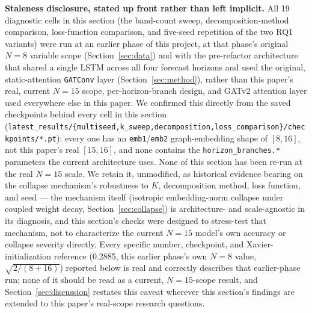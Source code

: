 \documentclass[journal]{IEEEtran}
\begin{document}
\textbf{Staleness disclosure, stated up front rather than left implicit.} All 19 diagnostic cells in this section (the band-count sweep, decomposition-method comparison, loss-function comparison, and five-seed repetition of the two RQ1 variants) were run at an earlier phase of this project, at that phase's original $N=8$ variable scope (Section~\ref{sec:data}) and with the pre-refactor architecture that shared a single LSTM across all four forecast horizons and used the original, static-attention \texttt{GATConv} layer (Section~\ref{sec:method}), rather than this paper's real, current $N=15$ scope, per-horizon-branch design, and GATv2 attention layer used everywhere else in this paper. We confirmed this directly from the saved checkpoints behind every cell in this section (\texttt{latest\_results/\{multiseed,k\_sweep,decomposition,loss\_comparison\}/checkpoints/*.pt}): every one has an \texttt{emb1}/\texttt{emb2} graph-embedding shape of $[8,16]$, not this paper's real $[15,16]$, and none contains the \texttt{horizon\_branches.*} parameters the current architecture uses. None of this section has been re-run at the real $N=15$ scale. We retain it, unmodified, as historical evidence bearing on the collapse mechanism's robustness to $K$, decomposition method, loss function, and seed --- the mechanism itself (isotropic embedding-norm collapse under coupled weight decay, Section~\ref{sec:collapse}) is architecture- and scale-agnostic in its diagnosis, and this section's checks were designed to stress-test that mechanism, not to characterize the current $N=15$ model's own accuracy or collapse severity directly. Every specific number, checkpoint, and Xavier-initialization reference (0.2885, this earlier phase's own $N=8$ value, $\sqrt{2/(8+16)}$) reported below is real and correctly describes that earlier-phase run; none of it should be read as a current, $N=15$-scope result, and Section~\ref{sec:discussion} restates this caveat wherever this section's findings are extended to this paper's real-scope research questions.
\end{document}
